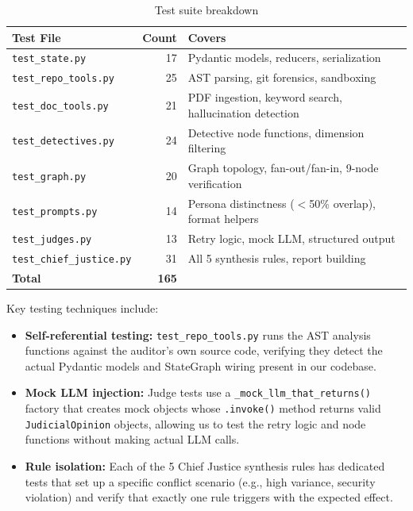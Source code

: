 \documentclass[12pt,a4paper]{article}
\begin{document}
\begin{table}[h]
\centering
\caption{Test suite breakdown}
\begin{tabular}{@{}lrl@{}}
\toprule
\textbf{Test File} & \textbf{Count} & \textbf{Covers} \\
\midrule
\texttt{test\_state.py}           & 17 & Pydantic models, reducers, serialization \\
\texttt{test\_repo\_tools.py}     & 25 & AST parsing, git forensics, sandboxing \\
\texttt{test\_doc\_tools.py}      & 21 & PDF ingestion, keyword search, hallucination detection \\
\texttt{test\_detectives.py}      & 24 & Detective node functions, dimension filtering \\
\texttt{test\_graph.py}           & 20 & Graph topology, fan-out/fan-in, 9-node verification \\
\texttt{test\_prompts.py}         & 14 & Persona distinctness ($<$50\% overlap), format helpers \\
\texttt{test\_judges.py}          & 13 & Retry logic, mock LLM, structured output \\
\texttt{test\_chief\_justice.py}  & 31 & All 5 synthesis rules, report building \\
\midrule
\textbf{Total} & \textbf{165} & \\
\bottomrule
\end{tabular}
\end{table}

Key testing techniques include:
\begin{itemize}[nosep]
  \item \textbf{Self-referential testing:} \texttt{test\_repo\_tools.py} runs the AST analysis functions against the auditor's own source code, verifying they detect the actual Pydantic models and StateGraph wiring present in our codebase.
  \item \textbf{Mock LLM injection:} Judge tests use a \texttt{\_mock\_llm\_that\_returns()} factory that creates mock objects whose \texttt{.invoke()} method returns valid \texttt{JudicialOpinion} objects, allowing us to test the retry logic and node functions without making actual LLM calls.
  \item \textbf{Rule isolation:} Each of the 5 Chief Justice synthesis rules has dedicated tests that set up a specific conflict scenario (e.g., high variance, security violation) and verify that exactly one rule triggers with the expected effect.
\end{itemize}
\end{document}
